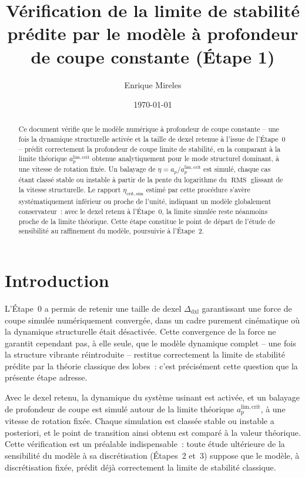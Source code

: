 \documentclass[
    11pt,
    a4paper
]{article}
\title{
    \textbf{Vérification de la limite de stabilité prédite par le modèle à profondeur de coupe constante (Étape 1)}
}
\author{
    Enrique Mireles
}
\date{\today}
\newcommand{\ap}{a_p}
\newcommand{\apcrit}{a_p^{\mathrm{lim,crit}}}
\newcommand{\dxlsize}{\Delta_{\mathrm{dxl}}}
\newcommand{\RMS}{\operatorname{RMS}}
\newcommand{\etasim}{\eta_{\mathrm{crit,sim}}}
\begin{document}
\maketitle

\begin{abstract}

Ce document vérifie que le modèle numérique à profondeur de coupe constante
-- une fois la dynamique structurelle activée et la taille de dexel
retenue à l'issue de l'Étape~0 -- prédit correctement la profondeur de coupe
limite de stabilité, en la comparant à la limite théorique
\(\apcrit\) obtenue analytiquement pour le mode structurel dominant, à une
vitesse de rotation fixée. Un balayage de \(\eta = \ap/\apcrit\) est simulé,
chaque cas étant classé stable ou instable à partir de la pente du logarithme
du \(\RMS\) glissant de la vitesse structurelle. Le rapport \(\etasim\) estimé
par cette procédure s'avère systématiquement inférieur ou proche de l'unité,
indiquant un modèle globalement conservateur~: avec le dexel retenu à
l'Étape~0, la limite simulée reste néanmoins proche de la limite théorique.
Cette étape constitue le point de départ de l'étude de sensibilité au
raffinement du modèle, poursuivie à l'Étape~2.

\end{abstract}

\tableofcontents

\newpage

\section{Introduction}
\label{sec-introduction}

L'Étape~0 a permis de retenir une taille de dexel \(\dxlsize\) garantissant
une force de coupe simulée numériquement convergée, dans un cadre purement
cinématique où la dynamique structurelle était désactivée. Cette convergence
de la force ne garantit cependant pas, à elle seule, que le modèle dynamique
complet -- une fois la structure vibrante réintroduite -- restitue
correctement la limite de stabilité prédite par la théorie classique des
lobes~: c'est précisément cette question que la présente étape adresse.

Avec le dexel retenu, la dynamique du système usinant est activée, et un
balayage de profondeur de coupe est simulé autour de la limite théorique
\(\apcrit\), à une vitesse de rotation fixée. Chaque simulation est classée
stable ou instable a posteriori, et le point de transition ainsi obtenu est
comparé à la valeur théorique. Cette vérification est un préalable
indispensable~: toute étude ultérieure de la sensibilité du modèle à sa
discrétisation (Étapes~2 et~3) suppose que le modèle, à discrétisation fixée,
prédit déjà correctement la limite de stabilité classique.
\end{document}
